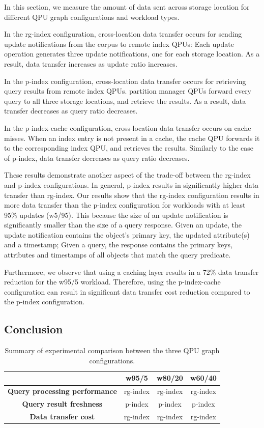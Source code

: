 In this section, we measure the amount of data sent across storage location for different QPU graph configurations and
workload types.

In the rg-index configuration, cross-location data transfer occurs for sending update notifications from the corpus
to remote index QPUs:
Each update operation generates three update notifications, one for each storage location.
As a result, data transfer increases as update ratio increases.

In the p-index configuration, cross-location data transfer occurs for retrieving query results from remote index QPUs.
partition manager QPUs forward every query to all three storage locations, and retrieve the results.
As a result, data transfer decreases as query ratio decreases.

In the p-index-cache configuration, cross-location data transfer occurs on cache misses.
When an index entry is not present in a cache, the cache QPU forwards it to the corresponding index QPU, and retrieves the
results.
Similarly to the case of p-index, data transfer decreases as query ratio decreases.

These results demonstrate another aspect of the trade-off between the rg-index and p-index configurations.
In general, p-index results in significantly higher data transfer than rg-index.
Our results show that the rg-index configuration results in more data transfer than the p-index configuration for workloads with at least 95\% updates (w5/95).
This because the size of an update notification is significantly smaller than the size of a query response.
Given an update, the update notification contains the object's primary key, the updated attribute(s) and a timestamp;
Given a query, the response contains the primary keys, attributes and timestamps of all objects that match the query predicate.

Furthermore, we observe that using a caching layer results in a 72\% data transfer reduction for the w95/5 workload.
Therefore, using the p-index-cache configuration can result in significant data transfer cost reduction compared to
the p-index configuration.

\subsection{Conclusion}

\begin{table}[H]
\centering
\begin{tabular}{|c||c|c|c||}
\hline
& \textbf{w95/5} & \textbf{w80/20} & \textbf{w60/40}\\
\hline
\textbf{Query processing performance} & rg-index & rg-index & rg-index \\
\hline
\textbf{Query result freshness} & p-index & p-index & p-index \\
\hline
\textbf{Data transfer cost} & rg-index & rg-index & rg-index \\
\hline
\end{tabular}
\caption{Summary of experimental comparison between the three QPU graph configurations.}
\label{tab:ycsb_summary}
\end{table}

